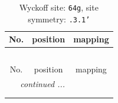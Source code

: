 \documentclass[fleqn,8pt]{jsarticle}
\begin{document}
\renewcommand{\arraystretch}{1.2}
\begin{longtable}{ccc}
\caption{Wyckoff site: {\tt 64g}, site symmetry: {\tt .3.1'}}
 \\
 \hline \hline
No. & position & mapping \\ \hline \endfirsthead

\multicolumn{2}{l}{\tablename\ \thetable{}} \\
 \hline \hline
No. & position & mapping \\ \hline \endhead

 \hline \hline
\multicolumn{2}{r}{\footnotesize\it continued ...} \\ \endfoot

 \hline \hline
\multicolumn{2}{r}{} \\ \endlastfoot


\end{longtable}
\end{document}
